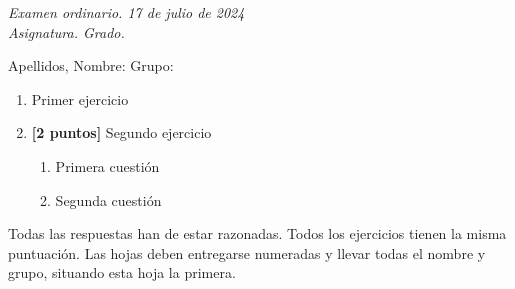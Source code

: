 \documentclass[monocromo]{UGR-examen}
\newcommand{\exGrado}{Grado\xspace}
\newcommand{\exAsignatura}{Asignatura\xspace}
\newcommand{\exConvocatoria}{ordinario\xspace}
\newcommand{\exFecha}{17 de julio de 2024\xspace}
\newcommand{\exInstrucciones}{Todas las respuestas han de estar razonadas. Todos los ejercicios tienen la misma puntuación. Las hojas deben entregarse numeradas y llevar todas el nombre y grupo, situando esta hoja la primera.\xspace}
\begin{document}
\vspace*{-2em}
\begin{center}
  \itshape
  {\large Examen \exConvocatoria. \exFecha}\\
  \exAsignatura. \exGrado.
\end{center}
\vspace{-1em}   
\normalsize{Apellidos, Nombre}: \hrulefill\hrulefill\hrulefill\hrulefill Grupo: \hrulefill 


\begin{enumerate}
  \item Primer ejercicio
  \item \textbf{[2 puntos]} Segundo ejercicio
    \begin{enumerate}
      \item Primera cuestión
      \item Segunda cuestión
    \end{enumerate}
\end{enumerate}


\vfill

{
  \footnotesize
  \exInstrucciones
}



%
\end{document}
